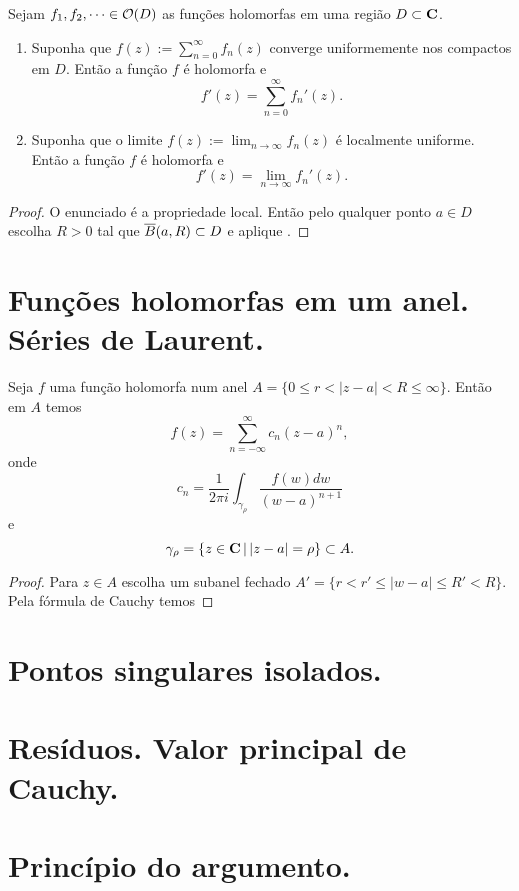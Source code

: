 \begin{teorema}[Weierstrass]
\label{t:weierstrass}
Sejam $f_1,f_2,\dots \in \mathcal{O}(D)$ as funções holomorfas em uma região $D\subset \mathbf{C}$.
\begin{enumerate}
\item
Suponha que $f(z) := \sum_{n=0}^\infty f_n(z)$ converge uniformemente
nos compactos em $D$. Então a função $f$ é holomorfa e
\[ f'(z) = \sum_{n=0}^\infty f_n'(z). \]
\item
Suponha que o limite $f(z) := \lim_{n\to\infty} f_n(z)$ é localmente uniforme.
Então a função $f$ é holomorfa e
\[ f'(z) = \lim_{n\to\infty} f_n'(z). \]
\end{enumerate}
\end{teorema}
\begin{proof}
O enunciado é a propriedade local.
Então pelo qualquer ponto $a\in D$ escolha $R>0$ tal que $\overline{B}(a,R) \subset D$
e aplique .
\end{proof}

\section{Funções holomorfas em um anel. Séries de Laurent.}

\begin{teorema}
Seja $f$ uma função holomorfa num anel $A = \{ 0\leq r < |z-a| < R \leq \infty \}$. Então em $A$ temos
\[ f(z) = \sum_{n=-\infty}^\infty c_n (z-a)^n, \]
onde
\[ c_n = \frac1{2\pi i} \int_{\gamma_\rho} \frac{f(w) dw}{(w-a)^{n+1}} \]
e
\[ \gamma_\rho = \{ z\in\mathbf{C} \,|\, |z-a|=\rho \} \subset A. \]
\end{teorema}
\begin{proof}
Para $z\in A$ escolha um subanel fechado $A' = \{ r < r'\leq |w-a| \leq R' < R \}$.
Pela fórmula de Cauchy temos

\end{proof}


\section{Pontos singulares isolados.}

\section{Resíduos. Valor principal de Cauchy.}

\section{Princípio do argumento.}
\begin{defin}
\end{defin}
\begin{teorema}
\end{teorema}
\begin{teorema}[Rouché]
\end{teorema}
\begin{cor}
\end{cor}

